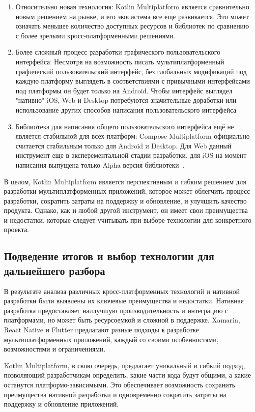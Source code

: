\documentclass[14pt, russian]{scrartcl}
\begin{document}
\begin{enumerate}
    \item Относительно новая технология: Kotlin Multiplatform является сравнительно новым решением на рынке, и его экосистема все еще развивается. Это может означать меньшее количество доступных ресурсов и библиотек по сравнению с более зрелыми кросс-платформенными решениями.
    \item Более сложный процесс разработки графического пользовательского интерфейса: Несмотря на возможность писать мультиплатформенный графический пользовательский интерфейс, без глобальных модификаций под каждую платформу выглядеть в соответствиями с привычными интерфейсами под платформы он будет только на Android. Чтобы интерфейс выглядел "нативно" iOS, Web и Desktop потребуются значительные доработки или использование других способов написания пользовательского интерфейса
    \item Библиотека для написания общего пользовательского интерфейса ещё не является стабильной для всех платформ: Compose Multiplatform официально считается стабильным только для Android и Desktop. Для Web данный инструмент еще в эксперементальной стадии разработки, для iOS на момент написания выпущена только Alpha версия библиотеки~\cite{ComposeMPiOS}.
\end{enumerate}

В целом, Kotlin Multiplatform является перспективным и гибким решением для разработки мультиплатформенных приложений, которое может облегчить процесс разработки, сократить затраты на поддержку и обновление, и улучшить качество продукта. Однако, как и любой другой инструмент, он имеет свои преимущества и недостатки, которые следует учитывать при выборе технологии для конкретного проекта.

\subsection{Подведение итогов и выбор технологии для дальнейшего разбора}

В результате анализа различных кросс-платформенных технологий и нативной разработки были выявлены их ключевые преимущества и недостатки. Нативная разработка предоставляет наилучшую производительность и интеграцию с платформами, но может быть ресурсоемкой и сложной в поддержке. Xamarin, React Native и Flutter предлагают разные подходы к разработке мультиплатформенных приложений, каждый со своими особенностями, возможностями и ограничениями.

Kotlin Multiplatform, в свою очередь, предлагает уникальный и гибкий подход, позволяющий разработчикам определить, какие части кода будут общими, а какие останутся платформо-зависимыми. Это обеспечивает возможность сохранить преимущества нативной разработки и одновременно сократить затраты на поддержку и обновление приложений.
\end{document}
